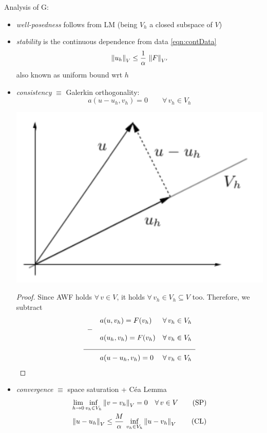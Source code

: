 Analysis of G:
\begin{itemize}
\item \emph{well-posedness} follows from LM (being $V_h$ a closed subspace of $V$)
\item \emph{stability} is the continuous dependence from data \eqref{eqn:contData}
\begin{equation*}
\left\lVert u_h \right\rVert_V\leq \frac{1}{\alpha}\,\left\lVert F \right\rVert_{V'} 
\end{equation*}
also known as uniform bound wrt $h$

\item \emph{consistency} $\equiv$ Galerkin orthogonality:
\begin{equation*}
a(u-u_h,v_h)=0\qquad\forall\, v_h\in V_h \tag{GO}
\end{equation*}

\begin{Figure}
    \centering
    \includegraphics[width=0.4\linewidth]{images/GO}
\end{Figure}

\begin{proof}
Since AWF holds $\forall\,v\in V$, it holds $\forall\,v_h\in V_h\subseteq V$ too. Therefore, we subtract
\begin{equation*}
\begin{array}{cll}
 & a(u,v_h)=F(v_h) & \forall\,v_h\in V_h \\
- & & \\
 & \underbracket[0pt]{a(u_h,v_h)=F(v_h)}_{\quad} & \forall\,v_h\in V_h \\
\hline
 & \overbracket[0pt]{a(u-u_h,v_h)=0}^{\quad} & \forall\,v_h\in V_h
\end{array} 
\end{equation*}
\end{proof}

\item \emph{convergence} $\equiv$ space saturation + Céa Lemma
\begin{gather*}
\lim_{h\to 0}\inf_{v_h\in V_h}\left\lVert v-v_h \right\rVert_V=0\quad\forall\, v\in V \tag{SP} \\
\left\lVert u-u_h \right\rVert_V\leq \frac{M}{\alpha}\,\inf_{v_h\in V_h}\left\lVert u-v_h \right\rVert_V \tag{CL}
\end{gather*}


\end{itemize}
